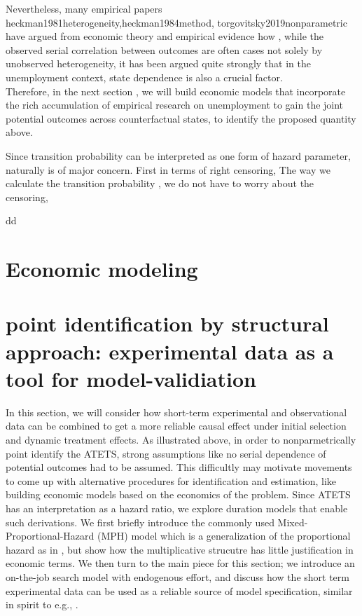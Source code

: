 \documentclass[uplatex,dvipdfmx]{jsarticle}
\begin{document}
Nevertheless, many empirical papers %
{heckman1981heterogeneity,heckman1984method, torgovitsky2019nonparametric} have argued from economic theory and empirical evidence how , while the observed serial correlation between outcomes are often cases not solely by unobserved heterogeneity, it has been argued quite strongly that in the unemployment context, state dependence is also a crucial factor. 
\\ Therefore, in the next section , we will build economic models that incorporate the rich accumulation of empirical research on unemployment  to gain the joint potential outcomes across counterfactual states, to identify the proposed quantity above.



\koko

\begin{remark}
\koko 
Since transition probability can be interpreted as one form of hazard parameter, naturally is of major concern. First in terms of right censoring, 
The way we calculate the transition probability , we do not have to worry about the censoring, 
\end{remark}
\begin{theorem}
dd
\end{theorem}

\section{Economic modeling}

\section{point identification by structural approach: experimental data as a tool for model-validiation}
In this section, we will consider how short-term experimental and observational data can be combined to get a more reliable causal effect under initial selection and dynamic treatment effects. As illustrated above, in order to nonparmetrically point identify the ATETS, strong assumptions like no serial dependence of potential outcomes 
had to be assumed. This difficultly may motivate movements to come up with alternative procedures for identification and estimation, like building economic models based on the economics of the problem. Since ATETS has an interpretation as a hazard ratio, we explore duration models that enable such derivations. We first briefly 
introduce the commonly used Mixed-Proportional-Hazard (MPH) model which is a generalization of the proportional hazard as in \cite{cox1972regression}, but show how the multiplicative strucutre has little justification in economic terms. We then turn to the main piece for this section; we introduce an on-the-job search model with endogenous effort,
and discuss how the short term experimental data can be used as a reliable source of model specification, similar in spirit to e.g., \cite{todd2020best}.
\end{document}

